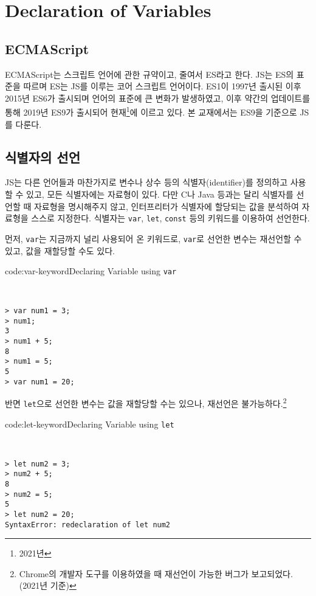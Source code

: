 \section{Declaration of Variables} \label{sect:declaration-of-variables}

\subsection*{ECMAScript}

ECMAScript는 스크립트 언어에 관한 규약이고, 줄여서 ES라고 한다. JS는 ES의 표준을 따르며 ES는 JS를 이루는 코어 스크립트 언어이다. ES1이 1997년 출시된 이후 2015년 ES6가 출시되며 언어의 표준에 큰 변화가 발생하였고, 이후 약간의 업데이트를 통해 2019년 ES9가 출시되어 현재\footnote{2021년}에 이르고 있다. 본 교재에서는 ES9을 기준으로 JS를 다룬다.

\subsection*{식별자의 선언}

JS는 다른 언어들과 마찬가지로 변수나 상수 등의 식별자(identifier)를 정의하고 사용할 수 있고, 모든 식별자에는 자료형이 있다. 다만 C나 Java 등과는 달리 식별자를 선언할 때 자료형을 명시해주지 않고, 인터프리터가 식별자에 할당되는 값을 분석하여 자료형을 스스로 지정한다. 식별자는 \texttt{var}, \texttt{let}, \texttt{const} 등의 키워드를 이용하여 선언한다.

먼저, \texttt{var}는 지금까지 널리 사용되어 온 키워드로, \texttt{var}로 선언한 변수는 재선언할 수 있고, 값을 재할당할 수도 있다.

\begin{codeenv}{code:var-keyword}{Declaring Variable using \texttt{var}}\begin{verbatim}


> var num1 = 3;
> num1;
3
> num1 + 5;
8
> num1 = 5;
5
> var num1 = 20;
\end{verbatim}
\end{codeenv}

반면 \texttt{let}으로 선언한 변수는 값을 재할당할 수는 있으나, 재선언은 불가능하다.\footnote{Chrome의 개발자 도구를 이용하였을 때 재선언이 가능한 버그가 보고되었다. (2021년 기준)}

\begin{codeenv}{code:let-keyword}{Declaring Variable using \texttt{let}}\begin{verbatim}


> let num2 = 3;
> num2 + 5;
8
> num2 = 5;
5
> let num2 = 20;
SyntaxError: redeclaration of let num2
\end{verbatim}
\end{codeenv}
\newpage

